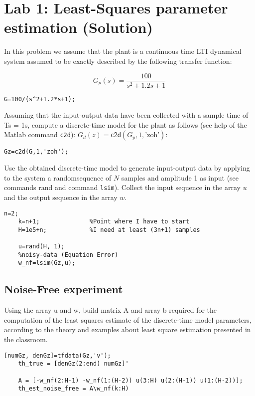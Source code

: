 \chapter{Lab 1: Least-Squares parameter estimation (Solution)}

In this problem we assume that the plant is a continuous time LTI dynamical system assumed
to be exactly described by the following transfer function:

\begin{equation*}
    G_p(s) = \frac{100}{s^2+1.2s+1}
\end{equation*}

\begin{lstlisting}[style=Matlab-editor]  
    G=100/(s^2+1.2*s+1);
\end{lstlisting}

\noindent
Assuming that the input-output data have been collected with a sample time of Ts = 1s,
compute a discrete-time model for the plant as follows (see help of the Matlab command
\texttt{c2d}): $G_d(z)=\textsf{c2d}(G_p,1,\text{'zoh'})$:

\begin{lstlisting}[style=Matlab-editor]  
    Gz=c2d(G,1,'zoh'); 
\end{lstlisting}

\noindent
Use the obtained discrete-time model to generate input-output data by applying to the system
a randomsequence of $N$ samples and amplitude 1 as input (see commands rand and command
\texttt{lsim}). Collect the input sequence in the array $u$ and the output sequence in the array $w$.

\begin{lstlisting}[style=Matlab-editor]    
    n=2; 
    k=n+1;              %Point where I have to start
    H=1e5+n;            %I need at least (3n+1) samples
            
    u=rand(H, 1);
    %noisy-data (Equation Error)
    w_nf=lsim(Gz,u);
\end{lstlisting}

\section{Noise-Free experiment}
\noindent
Using the array u and w, build matrix A and array b required for the computation of the least
squares estimate of the discrete-time model parameters, according to the theory and examples
about least square estimation presented in the classroom.

\begin{lstlisting}[style=Matlab-editor] 
    [numGz, denGz]=tfdata(Gz,'v');
    th_true = [denGz(2:end) numGz]'

    A = [-w_nf(2:H-1) -w_nf(1:(H-2)) u(3:H) u(2:(H-1)) u(1:(H-2))];
    th_est_noise_free = A\w_nf(k:H)
\end{lstlisting}

